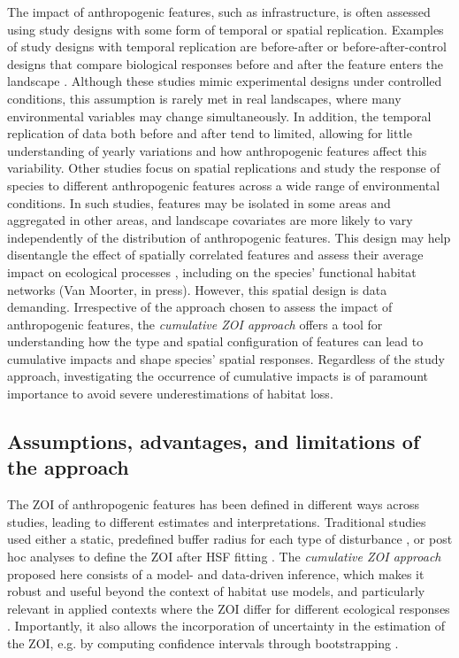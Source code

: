 \documentclass[titlepage]{article}
\begin{document}
The impact of anthropogenic features, such as infrastructure, is often assessed using study designs with some form of temporal or spatial replication. Examples of study designs with temporal replication are before-after or before-after-control designs that compare biological responses before and after the feature enters the landscape \citep{boulanger_estimation_2021,skarin_out_2018,dorber_indicators_2023}. Although these studies mimic experimental designs under controlled conditions, this assumption is rarely met in real landscapes, where many environmental variables may change simultaneously. In addition, the temporal replication of data both before and after tend to limited, allowing for little understanding of yearly variations and how anthropogenic features affect this variability. Other studies focus on spatial replications and study the response of species to different anthropogenic features across a wide range of environmental conditions. In such studies, features may be isolated in some areas and aggregated in other areas, and landscape covariates are more likely to vary independently of the distribution of anthropogenic features. This design may help disentangle the effect of spatially correlated features and assess their average impact on ecological processes \citep[e.g.][]{panzacchi_searching_2015}, including on the species’ functional habitat networks (Van Moorter, in press). However, this spatial design is data demanding. Irrespective of the approach chosen to assess the impact of anthropogenic features, the \textit{cumulative ZOI approach} offers a tool for understanding how the type and spatial configuration of features can lead to cumulative impacts and shape species’ spatial responses. Regardless of the study approach, investigating the occurrence of cumulative impacts is of paramount importance to avoid severe underestimations of habitat loss. 

\subsection{Assumptions, advantages, and limitations of the approach}

The ZOI of anthropogenic features has been defined in different ways across studies, leading to different estimates and interpretations. Traditional studies used either a static, predefined buffer radius for each type of disturbance \citep{polfus_identifying_2011}, or post hoc analyses to define the ZOI after HSF fitting \citep{johnson_cumulative_2005,plante_human_2018}. The \textit{cumulative ZOI approach} proposed here consists of a model- and data-driven inference, which makes it robust and useful beyond the context of habitat use models, and particularly relevant in applied contexts where the ZOI differ for different ecological responses \citep{moraga_scale_2019}. Importantly, it also allows the incorporation of uncertainty in the estimation of the ZOI, e.g. by computing confidence intervals through bootstrapping \citep{boulanger_estimation_2021,moraga_scale_2019}.
\end{document}
